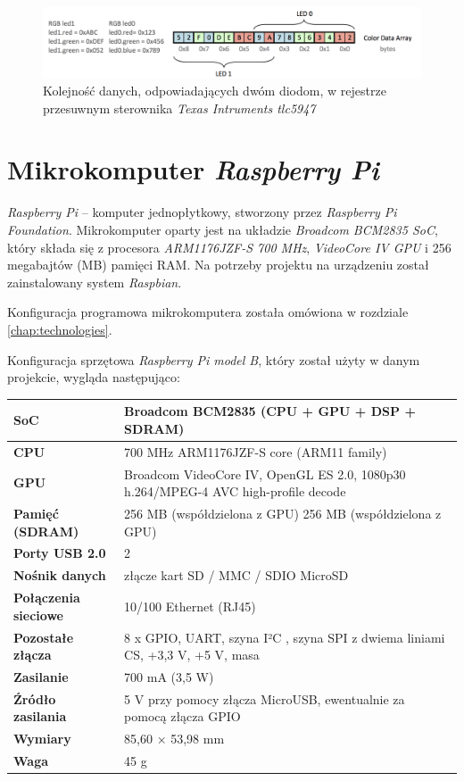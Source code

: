 \documentclass[eng,printmode]{mgr}
\begin{document}
\begin{figure}[!ht]
    \centering
    \includegraphics[width=\textwidth]{Figures/tlc_2leds.png} 
    \caption{Kolejność danych, odpowiadających dwóm diodom, w rejestrze przesuwnym sterownika \emph{Texas Intruments tlc5947}}
    \label{fig:tlc_2leds}
\end{figure}



\section{Mikrokomputer \emph{Raspberry Pi}}
\emph{Raspberry Pi} -- komputer jednopłytkowy, stworzony przez \emph{Raspberry Pi Foundation}. Mikrokomputer oparty jest na układzie \emph{Broadcom BCM2835 SoC}, który składa się z procesora \emph{ARM1176JZF-S 700 MHz}, \emph{VideoCore IV GPU} i 256 megabajtów (MB) pamięci RAM. Na potrzeby projektu na urządzeniu został zainstalowany system \emph{Raspbian}. 

Konfiguracja programowa mikrokomputera została omówiona w rozdziale \ref{chap:technologies}.

Konfiguracja sprzętowa \emph{Raspberry Pi model B}, który został użyty w danym projekcie, wygląda następująco:


\setlength{\tabcolsep}{10pt} %
\renewcommand{\arraystretch}{1.5} %
\vspace{0.5cm}
\begin{tabular}{| m{} | m{} |}
  \hline             
  \textbf{SoC} & Broadcom BCM2835 (CPU + GPU + DSP + SDRAM) \\ \hline
  \textbf{CPU} & 700 MHz ARM1176JZF-S core (ARM11 family) \\ \hline
  \textbf{GPU} & Broadcom VideoCore IV, OpenGL ES 2.0, 1080p30 h.264/MPEG-4 AVC high-profile decode \\ \hline
  \textbf{Pamięć (SDRAM)} & 256 MB (współdzielona z GPU)  256 MB (współdzielona z GPU) \\ \hline
  \textbf{Porty USB 2.0} & 2 \\ \hline
  \textbf{Nośnik danych} & złącze kart SD / MMC / SDIO MicroSD \\ \hline
  \textbf{Połączenia sieciowe} & 10/100 Ethernet (RJ45) \\ \hline
  \textbf{Pozostałe złącza} & 8 x GPIO, UART, szyna I²C , szyna SPI z dwiema liniami CS, +3,3 V, +5 V, masa \\ \hline
  \textbf{Zasilanie} & 700 mA (3,5 W) \\ \hline
  \textbf{Źródło zasilania} & 5 V przy pomocy złącza MicroUSB, ewentualnie za pomocą złącza GPIO \\ \hline
  \textbf{Wymiary} & 85,60 × 53,98 mm \\ \hline
  \textbf{Waga} & 45 g \\
  \hline  
\end{tabular}
\end{document}
